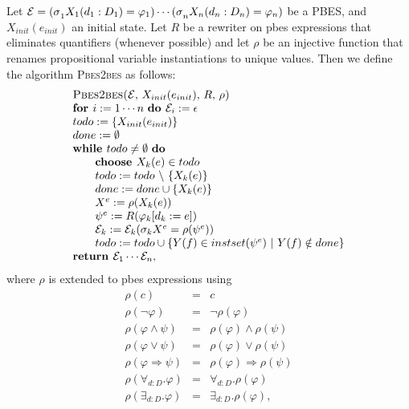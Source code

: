 \documentclass{article}
\begin{document}
Let $\mathcal{E=(\sigma }_{1}X_{1}(d_{1}:D_{1})=\varphi _{1})\cdots \mathcal{%
(\sigma }_{n}X_{n}(d_{n}:D_{n})=\varphi _{n})$ be a PBES, and $%
X_{init}(e_{init})$ an initial state. Let $R$ be a rewriter on pbes
expressions that eliminates quantifiers (whenever possible) and let $\rho $
be an injective function that renames propositional variable instantiations
to unique values. Then we define the algorithm \textsc{Pbes2bes} as follows:%
\[
\begin{array}{l}
\text{\textsc{Pbes2bes(}}\mathcal{E}\text{, }X_{init}(e_{init})\text{, }R%
\text{, }\rho \text{\textsc{)}} \\
\text{\textbf{for }}i:=1\cdots n\text{ \textbf{do }}\mathcal{E}%
_{i}:=\epsilon  \\
todo:=\{X_{init}(e_{init})\} \\
done:=\emptyset  \\
\text{\textbf{while }}todo\neq \emptyset \text{ \textbf{do}} \\
\qquad \text{\textbf{choose }}X_{k}(e)\in todo \\
\qquad todo:=todo\ \backslash \ \{X_{k}(e)\} \\
\qquad done:=done\cup \{X_{k}(e)\} \\
\qquad X^{e}:=\rho (X_{k}(e)) \\
\qquad \psi ^{e}:=R(\varphi _{k}[d_{k}:=e]) \\
\qquad \mathcal{E}_{k}:=\mathcal{E}_{k}(\mathcal{\sigma }_{k}X^{e}=\rho
(\psi ^{e})) \\
\qquad todo:=todo\cup \{Y(f)\in instset(\psi ^{e})\ |\ Y(f)\notin done\} \\
\text{\textbf{return }}\mathcal{E}_{1}\cdots \mathcal{E}_{n},%
\end{array}%
\]%
where $\rho $ is extended to pbes expressions using%
\begin{eqnarray*}
\rho (c) &=&c \\
\rho (\lnot \varphi ) &=&\lnot \rho (\varphi ) \\
\rho (\varphi \wedge \psi ) &=&\rho (\varphi )\wedge \rho (\psi ) \\
\rho (\varphi \vee \psi ) &=&\rho (\varphi )\vee \rho (\psi ) \\
\rho (\varphi \Rightarrow \psi ) &=&\rho (\varphi )\Rightarrow \rho (\psi )
\\
\rho (\forall _{d:D}.\varphi ) &=&\forall _{d:D}.\rho (\varphi ) \\
\rho (\exists _{d:D}.\varphi ) &=&\exists _{d:D}.\rho (\varphi ),
\end{eqnarray*}%
\end{document}
